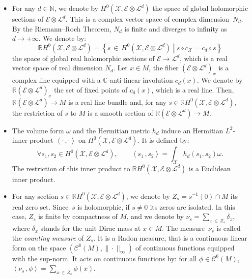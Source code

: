 \documentclass[10pt]{amsart}
\theoremstyle{definition}\newtheorem{defi}[theo]{Definition}\newtheorem{rema}[theo]{Remark}\newtheorem{exam}[theo]{Example}\newtheorem{exem}[theo]{Example}\newtheorem{nota}[theo]{Notation}
\newcommand{\E}{\mathcal{E}}
\newcommand{\X}{\mathcal{X}}
\renewcommand{\L}{\mathcal{L}}
\newcommand{\clC}{\mathcal{C}}
\newcommand{\C}{\mathbb{C}}
\newcommand{\N}{\mathbb{N}}
\newcommand{\R}{\mathbb{R}}
\newcommand{\prsc}[2]{\left\langle #1\,, #2 \right\rangle}
\renewcommand{\H}{H^0(\X,\E \otimes \L^d)}
\let\oldforall\forall
\renewcommand*{\forall}{\mathrel{\oldforall}}
\begin{document}
\begin{itemize}
\item For any $d \in \N$, we denote by $\H$ the space of global holomorphic sections of $\E \otimes \L^d$. This is a complex vector space of complex dimension~$N_d$. By the Riemann--Roch Theorem, $N_d$ is finite and diverges to infinity as $d \to +\infty$. We denote by:
\[
\R H^0\left(\X,\E \otimes \L^d\right) = \left\{s\,\in\,H^0\left(\X,\E \otimes \L^d\right) \middle| s \circ c_\X = c_d \circ s \right\}
\]
the space of global real holomorphic sections of $\E \to \L^d$, which is a real vector space of real dimension $N_d$. Let $x \in M$, the fiber $(\E \otimes \L^d)_x$ is a complex line equipped with a $\C$-anti-linear involution $c_d(x)$. We denote by $\R(\E \otimes \L^d)_x$ the set of fixed points of $c_d(x)$, which is a real line. Then, $\R(\E \otimes \L^d) \to M$ is a real line bundle and, for any $s \in \R\H$, the restriction of $s$ to $M$ is a smooth section of $\R(\E \otimes \L^d) \to M$.

\item The volume form $\omega$ and the Hermitian metric $h_d$ induce an Hermitian $L^2$-inner product $\prsc{\cdot}{\cdot}$ on $\H$. It is defined by:
\begin{equation}\label{eq def L2 inner product}
\forall s_1,s_2 \in H^0\left(\X,\E \otimes \L^d\right), \qquad \prsc{s_1}{s_2}=\int_\X h_d(s_1,s_2) \omega.
\end{equation}
The restriction of this inner product to $\R\H$ is a Euclidean inner product.

\item For any section $s \in \R\H$, we denote by $Z_s = s^{-1}(0) \cap M$ its real zero set. Since~$s$ is holomorphic, if $s \neq 0$ its zeros are isolated. In this case, $Z_s$ is finite by compactness of $M$, and we denote by $\nu_s = \sum_{x\,\in\, Z_s} \delta_x$, where $\delta_x$ stands for the unit Dirac mass at $x \in M$. The measure~$\nu_s$ is called the \emph{counting measure} of $Z_s$. It is a Radon measure, that is a continuous linear form on the space $(\clC^0(M), \|\cdot\|_\infty)$ of continuous functions equipped with the sup-norm. It acts on continuous functions by: for all $\phi \in \clC^0(M)$, $\prsc{\nu_s}{\phi} = \sum_{x\,\in\,Z_s} \phi(x)$.
\end{itemize}
\end{document}
